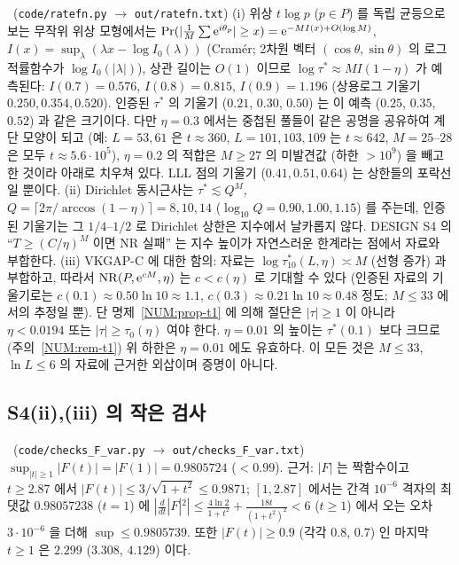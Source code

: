 \begin{remark}[해석]\label{NUM:rem-res-heur}
\HEUR\ (\texttt{code/ratefn.py} $\to$ \texttt{out/ratefn.txt})
(i) 위상 $t\log p$ ($p\in P$) 를 독립 균등으로 보는 무작위 위상 모형에서는 $\Pr(|\frac1M\sum\mathrm{e}^{i\theta_p}|\ge x)=\mathrm{e}^{-M I(x)+O(\log M)}$,
$I(x)=\sup_\lambda(\lambda x-\log I_0(\lambda))$ (Cramér; 2차원 벡터 $(\cos\theta,\sin\theta)$ 의 로그적률함수가 $\log I_0(|\lambda|)$), 상관 길이는 $O(1)$ 이므로
$\log\tau^*\approx M I(1-\eta)$ 가 예측된다: $I(0.7)=0.576$, $I(0.8)=0.815$, $I(0.9)=1.196$ (상용로그 기울기 $0.250,0.354,0.520$).
인증된 $\tau^*$ 의 기울기 ($0.21$, $0.30$, $0.50$) 는 이 예측 ($0.25$, $0.35$, $0.52$) 과 같은 크기이다. 다만 $\eta=0.3$ 에서는 중첩된 풀들이 같은 공명을 공유하여
계단 모양이 되고 (예: $L=53,61$ 은 $t\approx360$, $L=101,103,109$ 는 $t\approx642$, $M=25$--$28$ 은 모두 $t\approx5.6\cdot10^5$), $\eta=0.2$ 의 적합은
$M\ge27$ 의 미발견값 (하한 $>10^{9}$) 을 빼고 한 것이라 아래로 치우쳐 있다. LLL 점의 기울기 ($0.41,0.51,0.64$) 는 상한들의 포락선일 뿐이다.
(ii) Dirichlet 동시근사는 $\tau^*\lesssim Q^M$, $Q=\lceil2\pi/\arccos(1-\eta)\rceil=8,10,14$ ($\log_{10}Q=0.90,1.00,1.15$) 를 주는데, 인증된 기울기는 그 $1/4$--$1/2$ 로
Dirichlet 상한은 지수에서 날카롭지 않다. DESIGN S4 의 ``$T\ge(C/\eta)^M$ 이면 NR 실패'' 는 지수 높이가 자연스러운 한계라는 점에서 자료와 부합한다.
(iii) VKGAP-C 에 대한 함의: 자료는 $\log\tau^*_{10}(L,\eta)\asymp M$ (선형 증가) 과 부합하고, 따라서 $\mathrm{NR}(P,\mathrm{e}^{cM},\eta)$ 는 $c<c(\eta)$ 로
기대할 수 있다 (인증된 자료의 기울기로는 $c(0.1)\approx0.50\ln10\approx1.1$, $c(0.3)\approx0.21\ln10\approx0.48$ 정도; $M\le33$ 에서의 추정일 뿐). 단 명제~\ref{NUM:prop-t1} 에 의해 절단은 $|\tau|\ge1$ 이 아니라
$\eta<0.0194$ 또는 $|\tau|\ge\tau_0(\eta)$ 여야 한다. $\eta=0.01$ 의 높이는 $\tau^*(0.1)$ 보다 크므로 (주의~\ref{NUM:rem-t1}) 위 하한은 $\eta=0.01$ 에도 유효하다.
이 모든 것은 $M\le33$, $\ln L\le6$ 의 자료에 근거한 외삽이며 증명이 아니다.
\end{remark}


\subsection{S4(ii),(iii) 의 작은 검사}\label{NUM:ssec-checks}

\begin{proposition}\label{NUM:prop-F}
\NUMERIC\ (\texttt{code/checks\_F\_var.py} $\to$ \texttt{out/checks\_F\_var.txt})
$\sup_{|t|\ge1}|F(t)|=|F(1)|=0.9805724$ ($<0.99$). 근거: $|F|$ 는 짝함수이고 $t\ge2.87$ 에서 $|F(t)|\le3/\sqrt{1+t^2}\le0.9871$;
$[1,2.87]$ 에서는 간격 $10^{-6}$ 격자의 최댓값 $0.98057238$ ($t=1$) 에
$|\frac{d}{dt}|F|^2|\le\frac{4\ln2}{1+t^2}+\frac{18t}{(1+t^2)^2}<6$ ($t\ge1$) 에서 오는 오차 $3\cdot10^{-6}$ 을 더해 $\sup\le0.9805739$.
또한 $|F(t)|\ge0.9$ (각각 $0.8$, $0.7$) 인 마지막 $t\ge1$ 은 $2.299$ ($3.308$, $4.129$) 이다.
\end{proposition}

